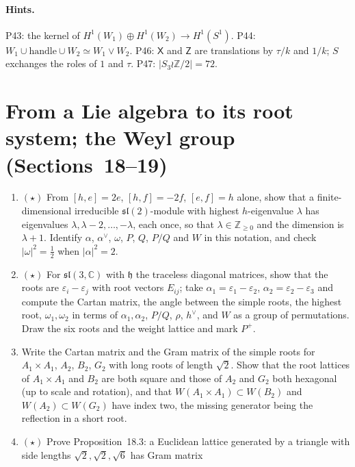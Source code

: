 \documentclass[11pt]{article}
\newcommand{\Z}{\mathbb{Z}}
\newcommand{\C}{\mathbb{C}}
\begin{document}
\paragraph{Hints.} P43: the kernel of $H^1(W_1)\oplus H^1(W_2)\to H^1(S^1)$. P44: $W_1\cup\text{handle}\cup W_2\simeq W_1\vee W_2$. P46: $\mathsf X$ and $\mathsf Z$ are translations by $\tau/k$ and $1/k$;
$S$ exchanges the roles of $1$ and $\tau$. P47: $|S_3\wr\Z/2| = 72$.

\section{From a Lie algebra to its root system; the Weyl group (Sections~18--19)}

\begin{enumerate}[label=\textbf{P\arabic*.},leftmargin=*,start=48]
\item $(\star)$ From $[h,e] = 2e$, $[h,f] = -2f$, $[e,f] = h$
  alone, show that a finite-dimensional irreducible $\mathfrak{sl}(2)$-module
  with highest $h$-eigenvalue $\lambda$ has eigenvalues
  $\lambda,\lambda-2,\dots,-\lambda$, each once, so that $\lambda\in\Z_{\ge0}$
  and the dimension is $\lambda+1$. Identify $\alpha$, $\alpha^\vee$,
  $\omega$, $P$, $Q$, $P/Q$ and $W$ in this notation, and check
  $|\omega|^2 = \tfrac12$ when $|\alpha|^2 = 2$.
\item $(\star)$ For $\mathfrak{sl}(3,\C)$ with $\mathfrak h$
  the traceless diagonal matrices, show that the roots are
  $\varepsilon_i-\varepsilon_j$ with root vectors $E_{ij}$; take
  $\alpha_1 = \varepsilon_1-\varepsilon_2$, $\alpha_2 = \varepsilon_2-\varepsilon_3$
  and compute the Cartan matrix, the angle between the simple roots, the
  highest root, $\omega_1,\omega_2$ in terms of $\alpha_1,\alpha_2$, $P/Q$,
  $\rho$, $h^\vee$, and $W$ as a group of permutations. Draw the six roots
  and the weight lattice and mark $P^+$.
\item Write the Cartan matrix and the Gram matrix of the
  simple roots for $A_1\times A_1$, $A_2$, $B_2$, $G_2$ with long roots of
  length $\sqrt2$. Show that the root lattices of $A_1\times A_1$ and $B_2$
  are both square and those of $A_2$ and $G_2$ both hexagonal (up to scale
  and rotation), and that $W(A_1\times A_1)\subset W(B_2)$ and
  $W(A_2)\subset W(G_2)$ have index two, the missing generator being the
  reflection in a short root.
\item $(\star)$ Prove Proposition~18.3: a Euclidean lattice generated by a triangle with
  side lengths $\sqrt2,\sqrt2,\sqrt6$ has Gram matrix

\end{enumerate}
\end{document}
